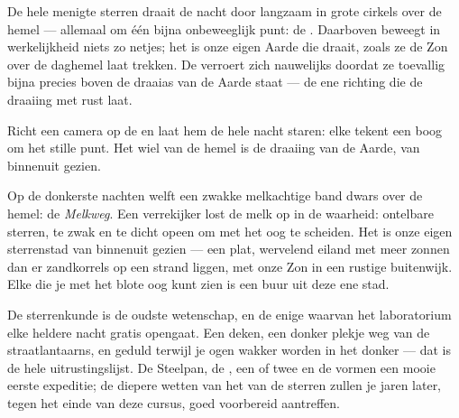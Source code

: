 \begin{proposition}\label{prop:g5:stars-night-sky:wheel}
De hele menigte sterren draait de nacht door langzaam in grote
cirkels over de hemel --- allemaal om één bijna onbeweeglijk punt: de
. Daarboven beweegt in werkelijkheid niets zo netjes; het is
onze eigen Aarde die draait, zoals ze de Zon over de daghemel laat
trekken. De  verroert zich nauwelijks doordat ze toevallig
bijna precies boven de draaias van de Aarde staat --- de ene richting
die de draaiing met rust laat.
\end{proposition}

\begin{omfigure}

{\small Richt een camera op de  en laat hem de hele nacht
staren: elke  tekent een boog om het stille punt. Het wiel van de
hemel is de draaiing van de Aarde, van binnenuit gezien.}
\end{omfigure}

\begin{example}\label{ex:g5:stars-night-sky:milkyway}
Op de donkerste nachten welft een zwakke melkachtige band dwars over
de hemel: de \emph{Melkweg}. Een verrekijker lost de
melk op in de waarheid: ontelbare sterren, te zwak en te dicht opeen
om met het oog te scheiden. Het is onze eigen sterrenstad van
binnenuit gezien --- een plat, wervelend eiland met meer zonnen dan er
zandkorrels op een strand liggen, met onze Zon in een rustige
buitenwijk. Elke  die je met het blote oog kunt zien is een buur
uit deze ene stad.
\end{example}

\begin{remark}\label{rem:g5:stars-night-sky:lookup}
De sterrenkunde is de oudste wetenschap, en de enige waarvan het
laboratorium elke heldere nacht gratis opengaat. Een deken, een donker
plekje weg van de straatlantaarns, en geduld terwijl je ogen wakker
worden in het donker --- dat is de hele uitrustingslijst. De Steelpan,
de , een  of twee en de  vormen een mooie
eerste expeditie; de diepere wetten van het  van de
sterren zullen je jaren later, tegen het einde van deze cursus, goed
voorbereid aantreffen.
\end{remark}

